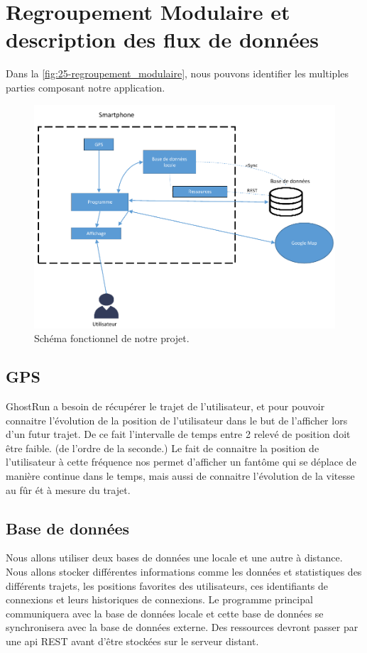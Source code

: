 \chapter{Regroupement Modulaire et description des flux de données}

Dans la \autoref{fig:25-regroupement_modulaire}, nous pouvons identifier les multiples parties composant notre application.

\begin{figure}[h]
    \centering
    \includegraphics[keepaspectratio, width=2\textwidth/2, height=2\textheight/5]{ima/regroupement_modulaire}
    \caption{Schéma fonctionnel de notre projet.}
    \label{fig:25-regroupement_modulaire}
\end{figure}

\section{GPS}
GhostRun a besoin de récupérer le trajet de l'utilisateur, et pour pouvoir connaitre l'évolution de la position de l'utilisateur
dans le but de l'afficher lors d'un futur trajet. De ce fait l'intervalle de temps entre 2 relevé de position doit être faible.
(de l'ordre de la seconde.)
Le fait de connaitre la position de l'utilisateur à cette fréquence nos permet d'afficher un fantôme qui se déplace de manière continue dans le temps,
mais aussi de connaitre l'évolution de la vitesse au fûr ét à mesure du trajet.

\section{Base de données}
Nous allons utiliser deux bases de données une locale et une autre à distance. Nous allons stocker différentes informations comme les données et statistiques des différents trajets, les positions favorites des utilisateurs, ces identifiants de connexions et leurs historiques de connexions.
Le programme principal communiquera avec la base de données locale et cette base de données se synchronisera avec la base de données externe. Des ressources devront passer par une api REST avant d’être stockées sur le serveur distant.



